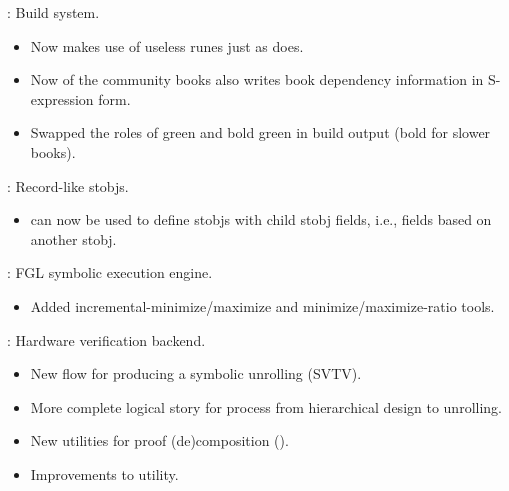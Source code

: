 
\begin{frame}

\implibtitle

:
Build system.
\begin{itemize}
\item Now  makes use of useless runes just as  does.
\item Now  of the community books also writes book dependency
  information in S-expression form.
\item Swapped the roles of green and bold green in build output (bold for
      slower books).
\end{itemize}

\end{frame}


\begin{frame}

\implibtitle

:
Record-like stobjs.
\begin{itemize}
\item {} can now be used to define stobjs with child
      stobj fields, i.e., fields based on another stobj.
\end{itemize}

\end{frame}


\begin{frame}

\implibtitle

:
FGL symbolic execution engine.
\begin{itemize}
\item Added incremental-minimize/maximize and minimize/maximize-ratio tools.
\end{itemize}
\end{frame}


\begin{frame}

\implibtitle

:
Hardware verification backend.
\begin{itemize}
\item New flow for producing a symbolic unrolling (SVTV).
\item More complete logical story for process
      from hierarchical design to unrolling.
\item New utilities for proof (de)composition ().
\item Improvements to  utility.
\end{itemize}

\end{frame}

